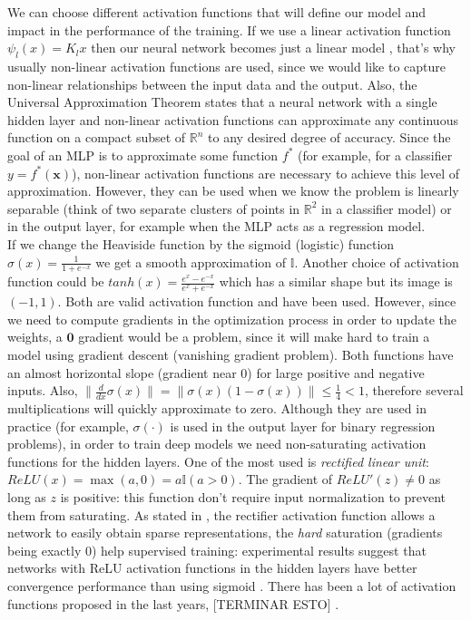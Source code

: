 We can choose different activation functions that will define our model and impact in the performance of the training. If we use a linear activation function $\psi_l (x) = K_l x$ then our neural network becomes just a linear model \cite{murphy2022}, that's why usually non-linear activation functions are used, since we would like to capture non-linear relationships between the input data and the output. Also, the Universal Approximation Theorem states that a neural network with a single hidden layer and non-linear activation functions can approximate any continuous function on a compact subset of $\mathbb{R}^n$ to any desired degree of accuracy.
Since the goal of an MLP is to approximate some function $f^*$ (for example, for a classifier $y = f^*(\mathbf{x})$), non-linear activation functions are necessary to achieve this level of approximation.
However, they can be used when we know the problem is linearly separable (think of two separate clusters of points in $\mathbb{R}^2$ in a classifier model) or in the output layer, for example when the MLP acts as a regression model.\\
If we change the Heaviside function by the sigmoid (logistic) function $\sigma(x) = \frac{1}{1+e^{-x}}$ we get a smooth approximation of $\mathbb{I}$. Another choice of activation function could be $tanh(x) = \frac{e^x - e^{-x}}{e^x + e^{-x}}$ which has a similar shape but its image is $(-1,1)$. Both are valid activation function and have been used. However, since we need to compute gradients in the optimization process in order to update the weights, a $\mathbf{0}$ gradient would be a problem, since it will make hard to train a model using gradient descent (vanishing gradient problem).
Both functions have an almost horizontal slope (gradient near 0) for large positive and negative inputs. Also, $\lVert \frac{d}{dx} \sigma(x) \rVert = \lVert \sigma(x)(1-\sigma(x)) \rVert \leq \frac{1}{4} < 1$, therefore several multiplications will quickly approximate to zero. Although they are used in practice (for example, $\sigma(\cdot)$ is used in the output layer for binary regression problems), in order to train deep models we need non-saturating activation functions for the hidden layers.
One of the most used is \textit{rectified linear unit}: $ReLU(x) = \max (a,0) = a \mathbb{I}(a>0)$. The gradient of $ReLU'(z) \neq 0$ as long as $z$ is positive: this function don't require input normalization to prevent them from saturating.
As stated in \cite*{glorot2011}, the rectifier activation function allows a network to easily obtain sparse representations, the \textit{hard} saturation (gradients being exactly 0) help supervised training: experimental results suggest that networks with ReLU activation functions in the hidden layers have better convergence performance than using sigmoid \cite{krizhevsky2017}.
There has been a lot of activation functions proposed in the last years, [TERMINAR ESTO] .\\

